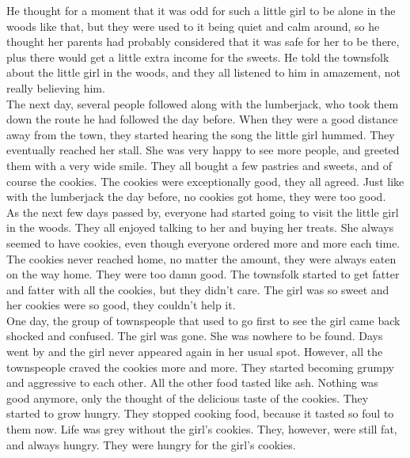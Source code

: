 \documentclass[a4paper,onecolumn,11pt]{article}
\begin{document}
\newline
He thought for a moment that it was odd for such a little girl to be alone in the woods like that, but they were used to it being quiet and calm around, so he thought her parents had probably considered that it was safe for her to be there, plus there would get a little extra income for the sweets. He told the townsfolk about the little girl in the woods, and they all listened to him in amazement, not really believing him.\\
\newline
The next day, several people followed along with the lumberjack, who took them down the route he had followed the day before. When they were a good distance away from the town, they started hearing the song the little girl hummed. They eventually reached her stall. She was very happy to see more people, and greeted them with a very wide smile. They all bought a few pastries and sweets, and of course the cookies. The cookies were exceptionally good, they all agreed. Just like with the lumberjack the day before, no cookies got home, they were too good.\\
\newline
As the next few days passed by, everyone had started going to visit the little girl in the woods. They all enjoyed talking to her and buying her treats. She always seemed to have cookies, even though everyone ordered more and more each time. The cookies never reached home, no matter the amount, they were always eaten on the way home. They were too damn good. The townsfolk started to get fatter and fatter with all the cookies, but they didn't care. The girl was so sweet and her cookies were so good, they couldn't help it.\\
\newline
One day, the group of townspeople that used to go first to see the girl came back shocked and confused. The girl was gone. She was nowhere to be found. Days went by and the girl never appeared again in her usual spot. However, all the townspeople craved the cookies more and more. They started becoming grumpy and aggressive to each other. All the other food tasted like ash. Nothing was good anymore, only the thought of the delicious taste of the cookies. They started to grow hungry. They stopped cooking food, because it tasted so foul to them now. Life was grey without the girl's cookies. They, however, were still fat, and always hungry. They were hungry for the girl's cookies.\\
\newline
\end{document}
